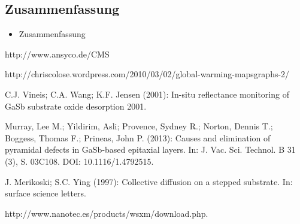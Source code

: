 \documentclass[paper=a4,fontsize=10pt,DIV=18,twocolumn,parskip=half]{scrartcl}
\numberwithin{equation}{section}    %
\begin{document}

\subsection{Zusammenfassung}
\begin{itemize}
\item Zusammenfassung
\end{itemize}

\begin{thebibliography}{}   

 http://www.ansyco.de/CMS

 http://chriscolose.wordpress.com/2010/03/02/global-warming-mapsgraphs-2/

 C.J. Vineis; C.A. Wang; K.F. Jensen (2001): In-situ reflectance 
monitoring of GaSb substrate oxide desorption 2001.

 Murray, Lee M.; Yildirim, Asli; Provence, Sydney R.; Norton, 
Dennis T.; Boggess, Thomas F.; Prineas, John P. (2013): Causes and elimination 
of pyramidal defects in GaSb-based epitaxial layers. In: J. Vac. Sci. Technol. B 
31 (3), S. 03C108. DOI: 10.1116/1.4792515.
  
 J. Merikoski; S.C. Ying (1997): Collective diffusion on a stepped substrate. In: surface science letters.

 http://www.nanotec.es/products/wsxm/download.php. 
\end{thebibliography}
\end{document}
